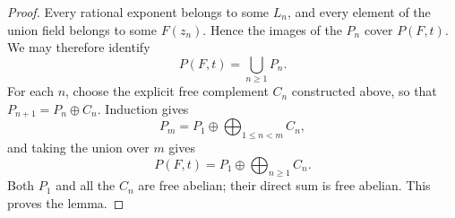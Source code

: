 \documentclass[10pt,a4paper]{amsart}
\begin{document}
\begin{proof}
Every rational exponent belongs to some $L_n$, and every element of the
union field belongs to some $F(z_n)$.  Hence the images of the $P_n$ cover
$P(F,t)$.  We may therefore identify
\[
  P(F,t)=\bigcup_{n\geq1}P_n.
\]
For each $n$, choose the explicit free complement $C_n$ constructed above,
so that $P_{n+1}=P_n\oplus C_n$.  Induction gives
\[
  P_m=P_1\oplus\bigoplus_{1\leq n<m}C_n,
\]
and taking the union over $m$ gives
\[
  P(F,t)=P_1\oplus\bigoplus_{n\geq1}C_n.
\]
Both $P_1$ and all the $C_n$ are free abelian; their direct sum is free
abelian.  This proves the lemma.
\end{proof}
\end{document}
